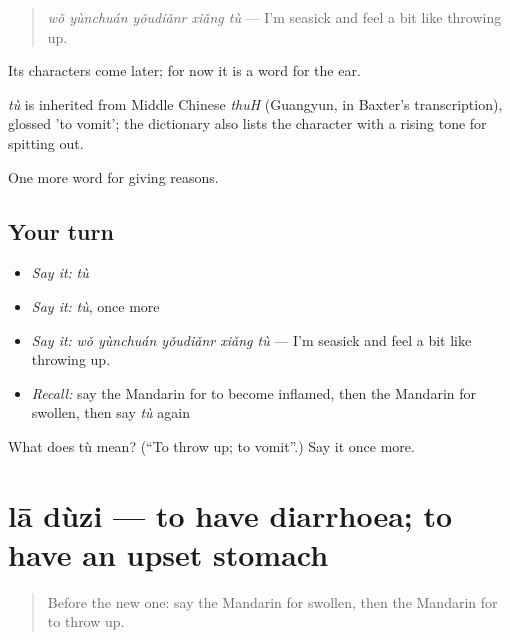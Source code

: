 \begin{quote}
\emph{wǒ yùnchuán yǒudiǎnr xiǎng tù} — I'm seasick and feel a bit like throwing up.
\end{quote}

Its characters come later; for now it is a word for the ear.

\begin{cousinweb}
\emph{tù} is inherited from Middle Chinese \emph{thuH} (Guangyun, in Baxter's transcription), glossed 'to vomit'; the dictionary also lists the character with a rising tone for spitting out.
\end{cousinweb}

\begin{grammarlens}[title={What you've built}]
One more word for giving reasons.
\end{grammarlens}

\subsection*{Your turn}
\begin{itemize}
\raggedright
  \item \emph{Say it:} \emph{tù}
  \item \emph{Say it:} \emph{tù}, once more
  \item \emph{Say it:} \emph{wǒ yùnchuán yǒudiǎnr xiǎng tù} — I'm seasick and feel a bit like throwing up.
  \item \emph{Recall:} say the Mandarin for to become inflamed, then the Mandarin for swollen, then say \emph{tù} again
\end{itemize}

\begin{tcolorbox}[breakable,colback=teal!4,colframe=teal!35!black,title={Before you move on}]
What does tù mean? (\textquotedblleft{}To throw up; to vomit\textquotedblright{}.) Say it once more.
\end{tcolorbox}
\section[lā dùzi]{lā dùzi — to have diarrhoea; to have an upset stomach}

\label{lesson:ZH-C240-laduzi}



\begin{quote}
Before the new one: say the Mandarin for swollen, then the Mandarin for to throw up.
\end{quote}

